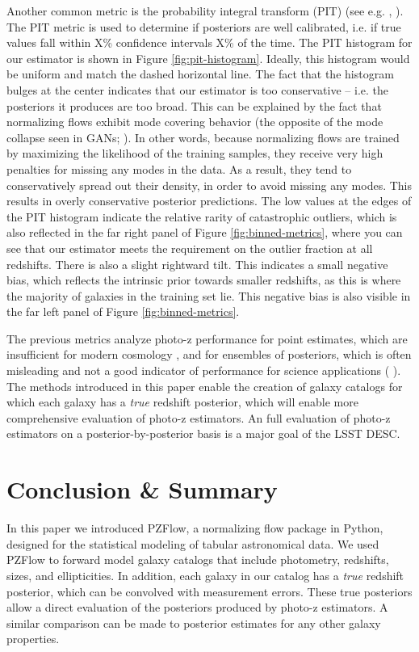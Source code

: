 \documentclass[twocolumn,twocolappendix,linenumbers]{aastex631}
\newcommand{\citePZp}{(\citetalias{schmidt2020} \citeyear{schmidt2020})\xspace}
\newcommand{\citePZa}{\citetalias{schmidt2020} \citeyear{schmidt2020}\xspace}
\begin{document}
Another common metric is the probability integral transform (PIT) (see e.g. \citePZa, \citealt{dey2022}).
The PIT metric is used to determine if posteriors are well calibrated, i.e. if true values fall within X\% confidence intervals X\% of the time.
The PIT histogram for our estimator is shown in Figure \ref{fig:pit-histogram}.
Ideally, this histogram would be uniform and match the dashed horizontal line.
The fact that the histogram bulges at the center indicates that our estimator is too conservative -- i.e. the posteriors it produces are too broad.
This can be explained by the fact that normalizing flows exhibit mode covering behavior (the opposite of the mode collapse seen in GANs; \citealt{salimans2016}).
In other words, because normalizing flows are trained by maximizing the likelihood of the training samples, they receive very high penalties for missing any modes in the data.
As a result, they tend to conservatively spread out their density, in order to avoid missing any modes.
This results in overly conservative posterior predictions.
The low values at the edges of the PIT histogram indicate the relative rarity of catastrophic outliers, which is also reflected in the far right panel of Figure \ref{fig:binned-metrics}, where you can see that our estimator meets the requirement on the outlier fraction at all redshifts.
There is also a slight rightward tilt.
This indicates a small negative bias, which reflects the intrinsic prior towards smaller redshifts, as this is where the majority of galaxies in the training set lie.
This negative bias is also visible in the far left panel of Figure \ref{fig:binned-metrics}.

The previous metrics analyze photo-z performance for point estimates, which are insufficient for modern cosmology \citep{newman2022}, and for ensembles of posteriors, which is often misleading and not a good indicator of performance for science applications \citePZp.
The methods introduced in this paper enable the creation of galaxy catalogs for which each galaxy has a \emph{true} redshift posterior, which will enable more comprehensive evaluation of photo-z estimators.
An full evaluation of photo-z estimators on a posterior-by-posterior basis is a major goal of the LSST DESC.


\section{Conclusion \& Summary}
\label{sec:conclusion}

In this paper we introduced PZFlow, a normalizing flow package in Python, designed for the statistical modeling of tabular astronomical data.
We used PZFlow to forward model galaxy catalogs that include photometry, redshifts, sizes, and ellipticities.
In addition, each galaxy in our catalog has a \emph{true} redshift posterior, which can be convolved with measurement errors.
These true posteriors allow a direct evaluation of the posteriors produced by photo-z estimators.
A similar comparison can be made to posterior estimates for any other galaxy properties.
\end{document}
